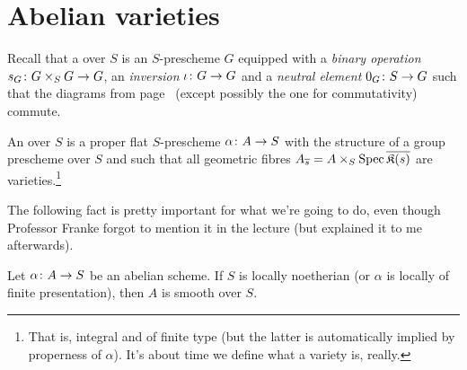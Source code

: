 \documentclass[a4paper,parskip=half,numbers=enddot, DIV=12]{scrreprt}
\begin{document}
\chapter{Abelian varieties}
Recall that a  over $S$ is an $S$-prescheme $G$ equipped with a \emph{binary operation} $s_G\colon G\times_SG\morphism G$, an \emph{inversion} $\iota\colon G\morphism G$ and a \emph{neutral element} $0_G\colon S\morphism G$ such that the diagrams from page~\pageref{par:groupScheme} (except possibly the one for commutativity) commute.
\begin{defi}
	An  over $S$ is a proper flat $S$-prescheme $\alpha\colon A\morphism S$ with the structure of a group prescheme over $S$  and such that all geometric fibres $A_{\overline{s}}=A\times_S\operatorname{Spec}\overline{\mathfrak{K}(s)}$ are varieties.\footnote{That is, integral and of finite type (but the latter is automatically implied by properness of $\alpha$). It's about time we define what a variety is, really.}
\end{defi}
The following fact is pretty important for what we're going to do, even though Professor Franke forgot to mention it in the lecture (but explained it to me afterwards).
\begin{fact}
	Let $\alpha\colon A\morphism S$ be an abelian scheme. If $S$ is locally noetherian (or $\alpha$ is locally of finite presentation), then $A$ is smooth over $S$.
\end{fact}
\end{document}
